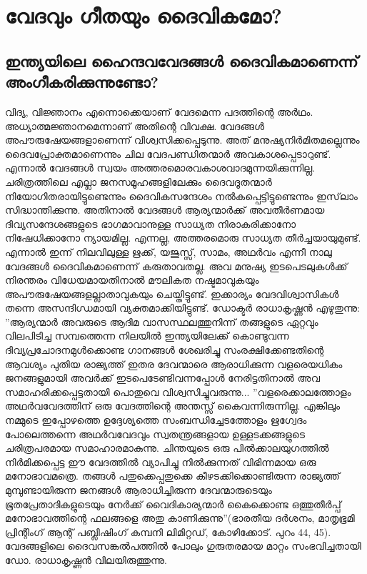 \chapter{വേദവും ഗീതയും ദൈവികമോ? }
  \section{ഇന്ത്യയിലെ ഹൈന്ദവവേദങ്ങള്‍ ദൈവികമാണെന്ന് അംഗീകരിക്കുന്നുണ്ടോ?}
 വിദ്യ, വിജ്ഞാനം എന്നൊക്കെയാണ് വേദമെന്ന പദത്തിന്റെ അര്‍ഥം. അധ്യാത്മജ്ഞാനമെന്നാണ് അതിന്റെ വിവക്ഷ. വേദങ്ങള്‍ അപൗരുഷേയങ്ങളാണെന്ന് വിശ്വസിക്കപ്പെടുന്നു. അത് മനുഷ്യനിര്‍മിതമല്ലെന്നും ദൈവപ്രോക്തമാണെന്നും ചില വേദപണ്ഡിതന്മാര്‍ അവകാശപ്പെടാറുണ്ട്. എന്നാല്‍ വേദങ്ങള്‍ സ്വയം അത്തരമൊരവകാശവാദമുന്നയിക്കുന്നില്ല.
ചരിത്രത്തിലെ എല്ലാ ജനസമൂഹങ്ങളിലേക്കും ദൈവദൂതന്മാര്‍ നിയോഗിതരായിട്ടുണ്ടെന്നും ദൈവികസന്ദേശം നല്‍കപ്പെട്ടിട്ടുണ്ടെന്നും ഇസ്‌ലാം സിദ്ധാന്തിക്കുന്നു. അതിനാല്‍ വേദങ്ങള്‍ ആര്യന്മാര്‍ക്ക് അവതീര്‍ണമായ ദിവ്യസന്ദേശങ്ങളുടെ ഭാഗമാവാനുള്ള സാധ്യത നിരാകരിക്കാനോ നിഷേധിക്കാനോ ന്യായമില്ല. എന്നല്ല, അത്തരമൊരു സാധ്യത തീര്‍ച്ചയായുമുണ്ട്. എന്നാല്‍ ഇന്ന് നിലവിലുള്ള ഋക്ക്, യജുസ്സ്, സാമം, അഥര്‍വം എന്നീ നാലു വേദങ്ങള്‍ ദൈവികമാണെന്ന് കരുതാവതല്ല. അവ മനുഷ്യ ഇടപെടലുകള്‍ക്ക് നിരന്തരം വിധേയമായതിനാല്‍ മൗലികത നഷ്ടമാവുകയും അപൗരുഷേയങ്ങളല്ലാതാവുകയും ചെയ്തിട്ടുണ്ട്. ഇക്കാര്യം വേദവിശ്വാസികള്‍ തന്നെ അസന്ദിഗ്ധമായി വ്യക്തമാക്കിയിട്ടുണ്ട്. ഡോക്ടര്‍ രാധാകൃഷ്ണന്‍ എഴുതുന്നു:
''ആര്യന്മാര്‍ അവരുടെ ആദിമ വാസസ്ഥലത്തുനിന്ന് തങ്ങളുടെ ഏറ്റവും വിലപിടിച്ച സമ്പത്തെന്ന നിലയില്‍ ഇന്ത്യയിലേക്ക് കൊണ്ടുവന്ന ദിവ്യപ്രചോദനമുള്‍ക്കൊണ്ട ഗാനങ്ങള്‍ ശേഖരിച്ചു സംരക്ഷിക്കേണ്ടതിന്റെ ആവശ്യം പുതിയ രാജ്യത്ത് ഇതര ദേവന്മാരെ ആരാധിക്കുന്ന വളരെയധികം ജനങ്ങളുമായി അവര്‍ക്ക് ഇടപെടേണ്ടിവന്നപ്പോള്‍ നേരിട്ടതിനാല്‍ അവ സമാഹരിക്കപ്പെട്ടതായി പൊതുവെ വിശ്വസിച്ചുവരുന്നു...
''വളരെക്കാലത്തോളം അഥര്‍വവേദത്തിന് ഒരു വേദത്തിന്റെ അന്തസ്സ് കൈവന്നിരുന്നില്ല. എങ്കിലും നമ്മുടെ ഇപ്പോഴത്തെ ഉദ്ദേശ്യത്തെ സംബന്ധിച്ചേടത്തോളം ഋഗ്വേദം പോലെത്തന്നെ അഥര്‍വവേദവും സ്വതന്ത്രങ്ങളായ ഉള്ളടക്കങ്ങളുടെ ചരിത്രപരമായ സമാഹാരമാകുന്നു. ചിന്തയുടെ ഒരു പില്‍ക്കാലയുഗത്തില്‍ നിര്‍മിക്കപ്പെട്ട ഈ വേദത്തില്‍ വ്യാപിച്ചു നില്‍ക്കുന്നത് വിഭിന്നമായ ഒരു മനോഭാവമത്രെ. തങ്ങള്‍ പതുക്കെപ്പതുക്കെ കീഴടക്കിക്കൊണ്ടിരുന്ന രാജ്യത്ത് മുമ്പുണ്ടായിരുന്ന ജനങ്ങള്‍ ആരാധിച്ചിരുന്ന ദേവന്മാരുടെയും ഭൂതപ്രേതാദികളുടെയും നേര്‍ക്ക് വൈദികാര്യന്മാര്‍ കൈക്കൊണ്ട ഒത്തുതീര്‍പ്പ് മനോഭാവത്തിന്റെ ഫലങ്ങളെ അതു കാണിക്കുന്നു''(ഭാരതീയ ദര്‍ശനം, മാതൃഭൂമി പ്രിന്റിംഗ് ആന്റ് പബ്ലിഷിംഗ് കമ്പനി ലിമിറ്റഡ്, കോഴിക്കോട്. പുറം 44, 45).
വേദങ്ങളിലെ ദൈവസങ്കല്‍പത്തില്‍ പോലും ഗുരുതരമായ മാറ്റം സംഭവിച്ചതായി ഡോ. രാധാകൃഷ്ണന്‍ വിലയിരുത്തുന്നു.
